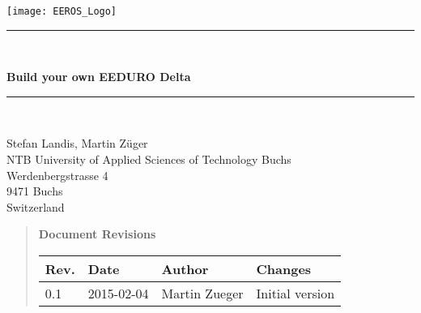 




\begin{titlepage}
	\begin{center}
		\texttt{[image: EEROS\_Logo]}
	\end{center}
	\vspace{4.5cm}
	{
		\selectfont
	
		\rule{\linewidth}{0.5mm} \\[0cm]
	
		\begin{center}
			{\huge \bfseries Build your own EEDURO Delta} \\
		\end{center}
		
		\rule{\linewidth}{0.5mm} \\[0.4cm]
		
		\vspace{1.5cm}
		
		Stefan Landis, Martin Züger \\
		
		
		NTB University of Applied Sciences of Technology Buchs\\
		Werdenbergstrasse 4\\
		9471 Buchs\\
		Switzerland\\
		\vfill
	}
\end{titlepage}
\clearpage

\begin{abstract}

\begin{large}
 \textbf{Document Revisions}
\end{large}

\begin{tabular}{|l|l|l|p{10cm}|}
\hline
\textbf{Rev.} & \textbf{Date} & \textbf{Author} & \textbf{Changes} \\
\hline
0.1 & 2015-02-04 & Martin Zueger & Initial version \\
\hline
\end{tabular} 

\end{abstract}
\setcounter{page}{1}
\setcounter{tocdepth}{2}
\tableofcontents


